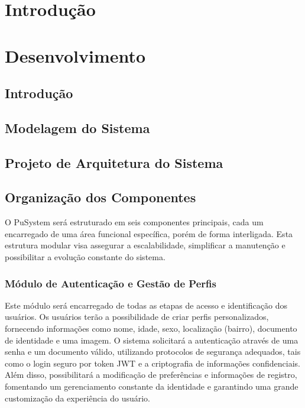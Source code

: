 \documentclass[a5paper, 12pt]{article}
\begin{document}


\newpage
\section{Introdução}
\newpage
\section{Desenvolvimento}

\subsection{Introdução}

\subsection{Modelagem do Sistema}

\subsection{Projeto de Arquitetura do Sistema}

\subsection{Organização dos Componentes}

O PuSystem será estruturado em seis componentes principais, cada um encarregado de uma área funcional específica, porém de forma interligada.  Esta estrutura modular visa assegurar a escalabilidade, simplificar a manutenção e possibilitar a evolução constante do sistema.

\subsubsection{Módulo de Autenticação e Gestão de Perfis}

Este módulo será encarregado de todas as etapas de acesso e identificação dos usuários.  Os usuários terão a possibilidade de criar perfis personalizados, fornecendo informações como nome, idade, sexo, localização (bairro), documento de identidade e uma imagem.  O sistema solicitará a autenticação através de uma senha e um documento válido, utilizando protocolos de segurança adequados, tais como o login seguro por token JWT e a criptografia de informações confidenciais.  Além disso, possibilitará a modificação de preferências e informações de registro, fomentando um gerenciamento constante da identidade e garantindo uma grande customização da experiência do usuário.
\end{document}
